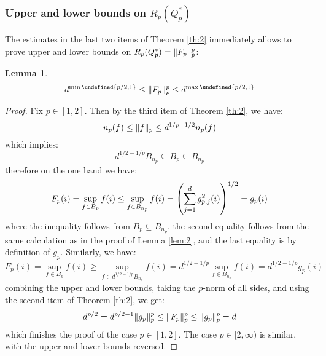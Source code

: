 \documentclass{article}
\theoremstyle{plain}
\newtheorem{lemma}{Lemma}
\theoremstyle{definition}
\theoremstyle{remark}
\let\brace\undefined
\DeclarePairedDelimiter{\brace}{\lbrace}{\rbrace}
\DeclarePairedDelimiter{\paren}{\lparen}{\rparen}
\DeclarePairedDelimiter{\norm}{\lVert}{\rVert}
\begin{document}
\subsubsection{Upper and lower bounds on $R_p(Q^*_p)$}
The estimates in the last two items of Theorem \ref{th:2} immediately allows to prove upper and lower bounds on $R_p(Q^*_p) = \norm{F_p}_p^p$:
\begin{lemma}
\label{lem:3}
    \begin{equation*}
         d^{\min{\brace{p/2, 1}}} \leq \norm{F_p}_p^p \leq d^{\max{\brace{p/2, 1}}}
    \end{equation*}
\end{lemma}

\begin{proof}
    Fix $p \in [1,2]$. Then by the third item of Theorem \ref{th:2}, we have:
    \begin{equation*}
        n_p(f) \leq \norm{f}_p \leq d^{1/p - 1/2} n_p(f)
    \end{equation*}
    which implies:
    \begin{equation*}
        d^{1/2 - 1/p} B_{n_p} \subseteq B_{p} \subseteq B_{n_p}
    \end{equation*}
    therefore on the one hand we have:
    \begin{equation*}
        F_p(i) = \sup_{f \in B_p} f(i) \leq \sup_{f \in B_{n_p}} f(i) = \paren*{\sum_{j=1}^{d} g^2_{p,j}(i)}^{1/2} = g_{p}(i)
    \end{equation*}
    where the inequality follows from $B_p \subseteq B_{n_p}$, the second equality follows from the same calculation as in the proof of Lemma \ref{lem:2}, and the last equality is by definition of $g_p$. Similarly, we have:
    \begin{equation*}
        F_p(i) = \sup_{f \in B_p} f(i) \geq \sup_{f \in d^{1/2 - 1/p} B_{n_p}} f(i) = d^{1/2 - 1/p} \sup_{f \in  B_{n_p}} f(i) = d^{1/2 - 1/p} g_{p}(i)
    \end{equation*}
    combining the upper and lower bounds, taking the $p$-norm of all sides, and using the second item of Theorem \ref{th:2}, we get:
    \begin{equation*}
         d^{p/2} = d^{p/2 - 1} \norm{g_p}_p^p \leq \norm{F_p}_p^p \leq \norm{g_p}_p^p = d 
    \end{equation*}
    which finishes the proof of the case $p \in [1,2]$. The case $p \in [2,\infty)$ is similar, with the upper and lower bounds reversed.
\end{proof}
\end{document}
